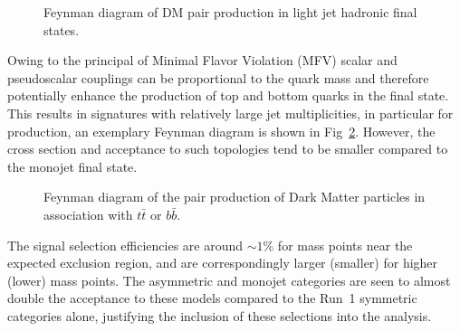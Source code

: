 \begin{figure}[h!] \centering
  \caption{Feynman diagram of DM pair production in light jet hadronic final states. \cite{Abercrombie:2015wmb}}
  \label{fig:DMfeynman} 
\end{figure}

Owing to the principal of Minimal Flavor Violation (MFV) scalar and 
pseudoscalar couplings can be proportional to the quark mass and therefore
potentially enhance the production of top and bottom quarks in the final state.
This results in signatures with relatively large jet multiplicities, in
particular for \DMtt production, an exemplary Feynman diagram is shown in 
Fig~\ref{fig:feynman_hf}. However, the cross section and acceptance to such 
topologies tend to be smaller compared to the monojet final state.

\begin{figure}[h!] \centering
  \caption{Feynman diagram of the pair production of Dark Matter particles in
  association with $t\bar{t}$ or $b\bar{b}$. \cite{Abercrombie:2015wmb}}
  \label{fig:feynman_hf}
\end{figure}

The signal selection efficiencies are around $\sim 1$\% for mass points near the expected exclusion
region, and are correspondingly larger (smaller) for higher (lower) mass points.
The asymmetric and monojet categories are seen to almost double the acceptance
to these models compared to the Run~1 symmetric categories alone, justifying the
inclusion of these selections into the analysis.

